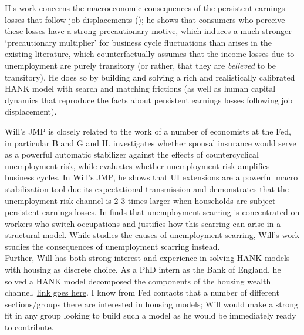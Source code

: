 \documentclass[\econtexRoot/Letter]{subfiles}
\begin{document}
\setcounter{page}{0}


His work concerns the macroeconomic consequences of the persistent earnings losses that follow job displacements (\cite{jacobson1993}); he shows that consumers who perceive these losses have a strong precautionary motive, which induces a much stronger `precautionary multiplier' for business cycle fluctuations than arises in the existing literature, which counterfactually assumes that the income losses due to unemployment are purely transitory (or rather, that they are \textit{believed} to be transitory). He does so by building and solving a rich and realistically calibrated HANK model with search and matching frictions (as well as human capital dynamics that reproduce the facts about persistent earnings losses following job displacement).

Will's JMP is closely related to the work of a number of economists at the Fed, in particular B and G and H.  \cite{BardoczySpousal} investigates whether spousal insurance would serve as a powerful automatic stabilizer against the effects of countercyclical unemployment risk, while \cite{gravesUrisk} evaluates whether unemployment risk amplifies business cycles. In Will's JMP, he shows that UI extensions are a powerful macro stabilization tool due its expectational transmission and demonstrates that the unemployment risk channel is 2-3 times larger when households are subject persistent earnings losses. In \cite{huckfeldtUscar} finds that unemployment scarring is concentrated on workers who switch occupations and justifies how this scarring can arise in a structural model. While \cite{huckfeldtUscar} studies the causes of unemployment scarring, Will's work studies the consequences of unemployment scarring instead.\\

Further, Will has both strong interest and experience in solving HANK models with housing as discrete choice. As a PhD intern as the Bank of England, he solved a HANK model decomposed the components of the housing wealth channel. \href{}{link goes here}.  I know from Fed contacts that a number of different sections/groups there are interested in housing models; Will would make a strong fit in any group looking to build such a model as he would be immediately ready to contribute. \\
\end{document}

